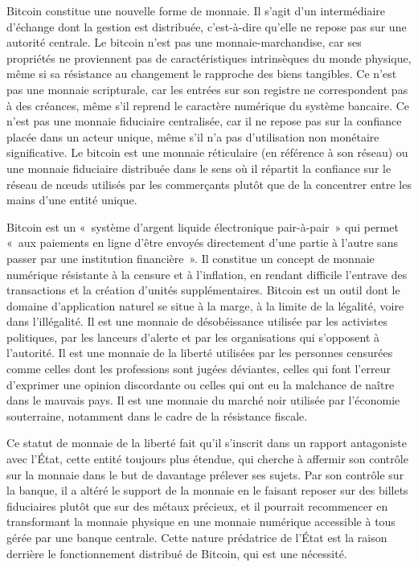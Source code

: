 Bitcoin constitue une nouvelle forme de monnaie. Il s'agit d'un intermédiaire d'échange dont la gestion est distribuée, c'est-à-dire qu'elle ne repose pas sur une autorité centrale. Le bitcoin n'est pas une monnaie-marchandise, car ses propriétés ne proviennent pas de caractéristiques intrinsèques du monde physique, même si sa résistance au changement le rapproche des biens tangibles. Ce n'est pas une monnaie scripturale, car les entrées sur son registre ne correspondent pas à des créances, même s'il reprend le caractère numérique du système bancaire. Ce n'est pas une monnaie fiduciaire centralisée, car il ne repose pas sur la confiance placée dans un acteur unique, même s'il n'a pas d'utilisation non monétaire significative. Le bitcoin est une monnaie réticulaire (en référence à son réseau) ou une monnaie fiduciaire distribuée dans le sens où il répartit la confiance sur le réseau de nœuds utilisés par les commerçants plutôt que de la concentrer entre les mains d'une entité unique.

Bitcoin est un «~système d'argent liquide électronique pair-à-pair~» qui permet «~aux paiements en ligne d'être envoyés directement d'une partie à l'autre sans passer par une institution financière~». Il constitue un concept de monnaie numérique résistante à la censure et à l'inflation, en rendant difficile l'entrave des transactions et la création d'unités supplémentaires. Bitcoin est un outil dont le domaine d'application naturel se situe à la marge, à la limite de la légalité, voire dans l'illégalité. Il est une monnaie de désobéissance utilisée par les activistes politiques, par les lanceurs d'alerte et par les organisations qui s'opposent à l'autorité. Il est une monnaie de la liberté utilisées par les personnes censurées comme celles dont les professions sont jugées déviantes, celles qui font l'erreur d'exprimer une opinion discordante ou celles qui ont eu la malchance de naître dans le mauvais pays. Il est une monnaie du marché noir utilisée par l'économie souterraine, notamment dans le cadre de la résistance fiscale.

Ce statut de monnaie de la liberté fait qu'il s'inscrit dans un rapport antagoniste avec l'État, cette entité toujours plus étendue, qui cherche à affermir son contrôle sur la monnaie dans le but de davantage prélever ses sujets. Par son contrôle sur la banque, il a altéré le support de la monnaie en le faisant reposer sur des billets fiduciaires plutôt que sur des métaux précieux, et il pourrait recommencer en transformant la monnaie physique en une monnaie numérique accessible à tous gérée par une banque centrale. Cette nature prédatrice de l'État est la raison derrière le fonctionnement distribué de Bitcoin, qui est une nécessité. %

